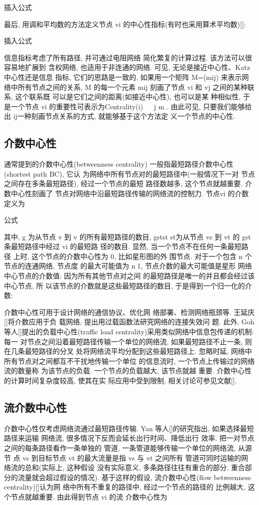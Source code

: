 			插入公式

			最后, 用调和平均数的方法定义节点 vi 的中心性指标(有时也采用算术平均数)[]:

			插入公式

			信息指标考虑了所有路径, 并可通过电阻网络 简化繁复的计算过程. 该方法可以很容易地扩展到 含权网络, 也适用于非连通的网络.
			可见, 无论是接近中心性、Katz 中心性还是信息 指标, 它们的思路是一致的. 如果用一个矩阵 M=(mij) 来表示网络中所有节点之间的关系, M 的每一个元素 mij 刻画了节点 vi 和 vj 之间的某种联系, 这个联系既 可以是它们之间的距离(如接近中心性), 也可以是某 种相似性, 于是一个节点 vi 的重要性可表示为Centrality(i)   j m . 由此可见, 只要我们能够给出 ij一种刻画节点关系的方式, 就能够基于这个方法定 义一个节点的中心性.
\subsection{介数中心性}
通常提到的介数中心性(betweenness centrality) 一般指最短路径介数中心性(shortest path BC), 它认 为网络中所有节点对的最短路径中(一般情况下一对 节点之间存在多条最短路径), 经过一个节点的最短 路径数越多, 这个节点就越重要. 介数中心性刻画了 节点对网络中沿最短路径传输的网络流的控制力. 节点vi 的介数定义为

			公式

			其中, g 为从节点 v 到 v 的所有最短路径的数目, gstst st为从节点 vs 到 vt 的 gst 条最短路径中经过 vi 的最短路 径的数目. 显然, 当一个节点不在任何一条最短路径 上时, 这个节点的介数中心性为 0, 比如星形图的外 围节点. 对于一个包含 n 个节点的连通网络, 节点度 的最大可能值为 n1, 节点介数的最大可能值是星形 网络中心节点的介数值: 因为所有其他节点对之间 的最短路径是唯一的并且都会经过该中心节点, 所 以该节点的介数就是这些最短路径的数目, 于是得到一个归一化的介数:

			介数中心性可用于设计网络的通信协议、优化网 络部署、检测网络瓶颈等. 王延庆[]将介数应用于负 载网络, 提出用过载函数法研究网络的连接失效问 题. 此外, Goh 等人[]提出的负载中心性(traffic load centrality)采用类似网络中信息包传递的机制: 每一 对节点之间沿着最短路径传输一个单位的网络流, 如果最短路径不止一条, 则在几条最短路径的分叉 处将网络流平均分配到这些最短路径上. 忽略时延, 网络中所有节点对之间都互不干扰地传输一个单位 的信息流时, 一个节点上传输过的网络流的数量称 为该节点的负载. 一个节点的负载越大, 该节点就越 重要. 介数中心性的计算时间复杂度较高, 使其在实 际应用中受到限制, 相关讨论可参见文献[].

\subsection{流介数中心性}
介数中心性仅考虑网络流通过最短路径传输. Yan 等人[]的研究指出, 如果选择最短路径来运输 网络流, 很多情况下反而会延长出行时间、降低出行 效率. 把一对节点之间的每条路径看作一条单独的 管道, 一条管道能够传输一个单位的网络流, 从源节 点 vs 到目标节点 vt 的最大流量是指 vs 与 vt 之间所有 管道可同时运输的网络流的总和(实际上, 这种假设 没有实际意义, 多条路径往往有重合的部分, 重合部 分的流量就会超过假设的情况). 基于这样的假设, 流介数中心性(flow betweenness centrality)[]认为网 络中所有不重复的路径中, 经过一个节点的路径的 比例越大, 这个节点就越重要. 由此得到节点 vi 的流 介数中心性为

